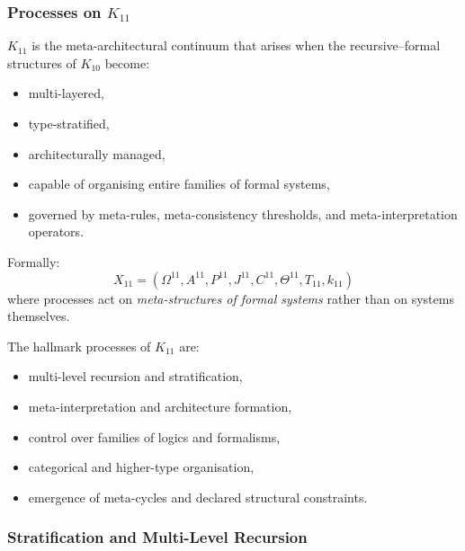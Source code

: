 

\subsubsection{Processes on $K_{11}$}
\label{sec:processes-k11}

$K_{11}$ is the meta-architectural continuum that arises when the
recursive–formal structures of $K_{10}$ become:
\begin{itemize}
    \item multi-layered,
    \item type-stratified,
    \item architecturally managed,
    \item capable of organising entire families of formal systems,
    \item governed by meta-rules, meta-consistency thresholds, 
          and meta-interpretation operators.
\end{itemize}

Formally:
\[
X_{11} = (\Omega^{11}, A^{11}, P^{11}, J^{11}, 
          C^{11}, \Theta^{11}, T_{11}, k_{11})
\]
where processes act on \emph{meta-structures of formal systems} rather 
than on systems themselves.

The hallmark processes of $K_{11}$ are:
\begin{itemize}
    \item multi-level recursion and stratification,
    \item meta-interpretation and architecture formation,
    \item control over families of logics and formalisms,
    \item categorical and higher-type organisation,
    \item emergence of meta-cycles and declared structural constraints.
\end{itemize}

\subsubsection{Stratification and Multi-Level Recursion}

